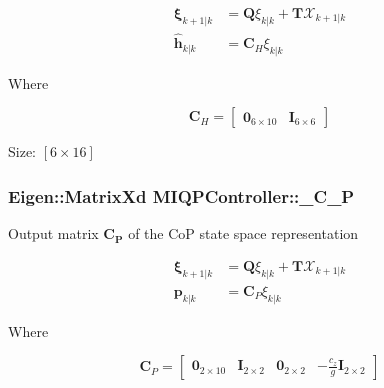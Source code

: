 \begin{align*} \mathbf{\xi}_{k+1|k} &= \mathbf{Q} \xi_{k|k} + \mathbf{T}\mathcal{X}_{k+1|k} \\ \hat{\mathbf{h}}_{k|k} & =\mathbf{C}_H \xi_{k|k} \end{align*}

\-Where

\[ \mathbf{C}_H = \left[ \begin{array}{cc} \mathbf{0}_{6\times10} & \mathbf{I}_{6\times6} \end{array} \right] \]

\-Size\-: $[6\times16]$ \hypertarget{classMIQPController_a17cf6f8279cf6b2ce333feb9c8fc5a5d}{
\subsubsection[{\-\_\-\-C\-\_\-\-P}]{\setlength{\rightskip}{0pt plus 5cm}\-Eigen\-::\-Matrix\-Xd {\bf \-M\-I\-Q\-P\-Controller\-::\-\_\-\-C\-\_\-\-P}}}\label{classMIQPController_a17cf6f8279cf6b2ce333feb9c8fc5a5d}
\-Output matrix $\mathbf{C_P}$ of the \-Co\-P state space representation

\begin{align*} \mathbf{\xi}_{k+1|k} &= \mathbf{Q} \xi_{k|k} + \mathbf{T}\mathcal{X}_{k+1|k} \\ \mathbf{p}_{k|k} & =\mathbf{C}_P \xi_{k|k} \end{align*}

\-Where

\[ \mathbf{C}_P = \left[ \begin{array}{ccccc} \mathbf{0}_{2\times10} & \mathbf{I}_{2\times2} & \mathbf{0}_{2\times2} & -\frac{c_z}{g}\mathbf{I}_{2\times2} \end{array}\right] \]

